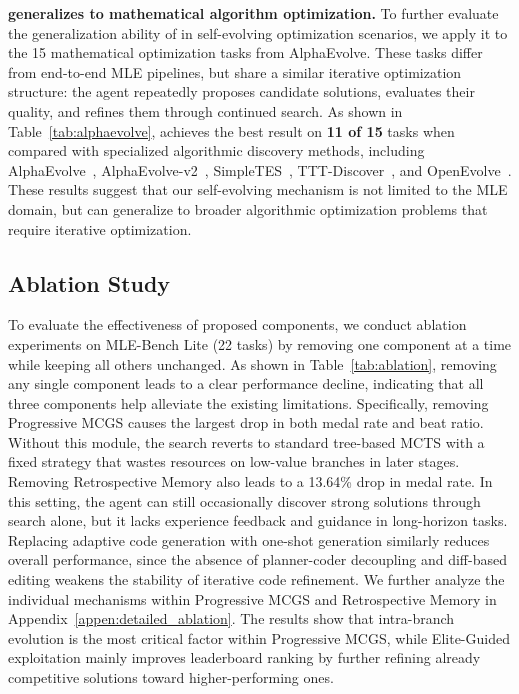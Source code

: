 

\noindent\textbf{\sname generalizes to mathematical algorithm optimization.} To further evaluate the generalization ability of \sname in self-evolving optimization scenarios, we apply it to the 15 mathematical optimization tasks from AlphaEvolve. These tasks differ from end-to-end MLE pipelines, but share a similar iterative optimization structure: the agent repeatedly proposes candidate solutions, evaluates their quality, and refines them through continued search.
As shown in Table~\ref{tab:alphaevolve}, \sname achieves the best result on \textbf{11 of 15} tasks when compared with specialized algorithmic discovery methods, including AlphaEvolve~\citep{novikov2025alphaevolve}, AlphaEvolve-v2~\citep{alphaevolve_v2}, SimpleTES~\citep{simpleTes}, TTT-Discover~\citep{ttt-discover}, and OpenEvolve~\citep{openevolve}. These results suggest that our self-evolving mechanism is not limited to the MLE domain, but can generalize to broader algorithmic optimization problems that require iterative optimization.


\subsection{Ablation Study}
\label{sec:ablation}



To evaluate the effectiveness of proposed components, we conduct ablation experiments on MLE-Bench Lite (22 tasks) by removing one component at a time while keeping all others unchanged.
As shown in Table~\ref{tab:ablation}, removing any single component leads to a clear performance decline, indicating that all three components help alleviate the existing limitations. Specifically, removing Progressive MCGS causes the largest drop in both medal rate and beat ratio. Without this module, the search reverts to standard tree-based MCTS with a fixed strategy that wastes resources on low-value branches in later stages. Removing Retrospective Memory also leads to a 13.64\% drop in medal rate. In this setting, the agent can still occasionally discover strong solutions through search alone, but it lacks experience feedback and guidance in long-horizon tasks. Replacing adaptive code generation with one-shot generation similarly reduces overall performance, since the absence of planner-coder decoupling and diff-based editing weakens the stability of iterative code refinement.
We further analyze the individual mechanisms within Progressive MCGS and Retrospective Memory in Appendix~\ref{appen:detailed_ablation}. The results show that intra-branch evolution is the most critical factor within Progressive MCGS, while Elite-Guided exploitation mainly improves leaderboard ranking by further refining already competitive solutions toward higher-performing ones.

